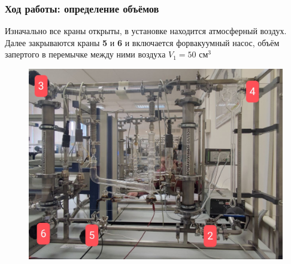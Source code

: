 \begin{frame}\frametitle{Ход работы: определение объёмов}
    Изначально все краны открыты, в установке находится атмосферный воздух. Далее закрываются краны \textbf{5} и \textbf{6} и включается форвакуумный насос, объём запертого в перемычке между ними воздуха \(V_1 = 50 \text{ см}^3\)
    \begin{figure}
        \centering
        \includegraphics[scale=0.19]{images/valve.jpg}
    \end{figure}
\end{frame}


